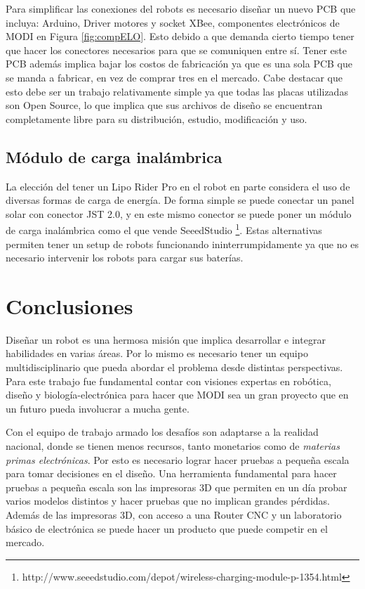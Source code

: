 Para simplificar las conexiones del robots es necesario diseñar un nuevo PCB que incluya: Arduino, Driver motores y socket XBee, componentes electrónicos de MODI en Figura \ref{fig:compELO}. Esto debido a que demanda cierto tiempo tener que hacer los conectores necesarios para que se comuniquen entre sí. Tener este PCB además implica bajar los costos de fabricación ya que es una sola PCB que se manda a fabricar, en vez de comprar tres en el mercado. Cabe destacar que esto debe ser un trabajo relativamente simple ya que todas las placas utilizadas son Open Source, lo que implica que sus archivos de diseño se encuentran completamente libre para su distribución, estudio, modificación y uso.



\subsection{Módulo de carga inalámbrica}
La elección del tener un Lipo Rider Pro en el robot en parte considera el uso de diversas formas de carga de energía. De forma simple se puede conectar un panel solar con conector JST 2.0, y en este mismo conector se puede poner un módulo de carga inalámbrica como el que vende SeeedStudio \footnote{http://www.seeedstudio.com/depot/wireless-charging-module-p-1354.html}. Estas alternativas permiten tener un setup de robots funcionando ininterrumpidamente ya que no es necesario intervenir los robots para cargar sus baterías. 



\section{Conclusiones}
Diseñar un robot es una hermosa misión que implica desarrollar e integrar habilidades en varias áreas. Por lo mismo es necesario tener un equipo multidisciplinario que pueda abordar el problema desde distintas perspectivas. Para este trabajo fue fundamental contar con visiones expertas en robótica, diseño y biología-electrónica para hacer que MODI sea un gran proyecto que en un futuro pueda involucrar a mucha gente.

Con el equipo de trabajo armado los desafíos son adaptarse a la realidad nacional, donde se tienen menos recursos, tanto monetarios como de \textit{materias primas electrónicas}. Por esto es necesario lograr  hacer pruebas a pequeña escala para tomar decisiones en el diseño. Una herramienta fundamental para hacer pruebas a pequeña escala son las impresoras 3D que permiten en un día probar varios modelos distintos y hacer pruebas que no implican grandes pérdidas. Además de las impresoras 3D, con acceso a una Router CNC y un laboratorio básico de electrónica se puede hacer un producto que puede competir en el mercado.

